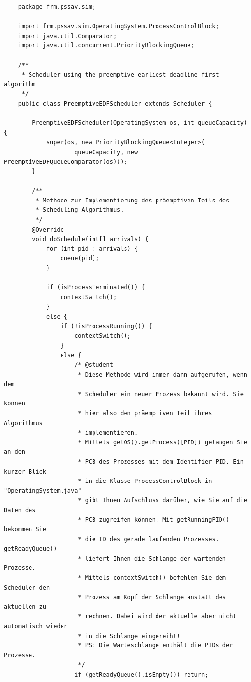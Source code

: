\documentclass[a4paper]{article}
\begin{document}
\begin{lstlisting}
    package frm.pssav.sim;
    
    import frm.pssav.sim.OperatingSystem.ProcessControlBlock;
    import java.util.Comparator;
    import java.util.concurrent.PriorityBlockingQueue;
    
    /**
     * Scheduler using the preemptive earliest deadline first algorithm
     */
    public class PreemptiveEDFScheduler extends Scheduler {
        
        PreemptiveEDFScheduler(OperatingSystem os, int queueCapacity) {
            super(os, new PriorityBlockingQueue<Integer>(
                    queueCapacity, new PreemptiveEDFQueueComparator(os)));
        }
    
        /**
         * Methode zur Implementierung des präemptiven Teils des 
         * Scheduling-Algorithmus.
         */
        @Override
        void doSchedule(int[] arrivals) {
            for (int pid : arrivals) {
                queue(pid);
            }
    
            if (isProcessTerminated()) {
                contextSwitch();
            }
            else {
                if (!isProcessRunning()) {
                    contextSwitch();
                }
                else {
                    /* @student
                     * Diese Methode wird immer dann aufgerufen, wenn dem
                     * Scheduler ein neuer Prozess bekannt wird. Sie können
                     * hier also den präemptiven Teil ihres Algorithmus
                     * implementieren. 
                     * Mittels getOS().getProcess([PID]) gelangen Sie an den
                     * PCB des Prozesses mit dem Identifier PID. Ein kurzer Blick
                     * in die Klasse ProcessControlBlock in "OperatingSystem.java"
                     * gibt Ihnen Aufschluss darüber, wie Sie auf die Daten des 
                     * PCB zugreifen können. Mit getRunningPID() bekommen Sie 
                     * die ID des gerade laufenden Prozesses. getReadyQueue()
                     * liefert Ihnen die Schlange der wartenden Prozesse.
                     * Mittels contextSwitch() befehlen Sie dem Scheduler den
                     * Prozess am Kopf der Schlange anstatt des aktuellen zu
                     * rechnen. Dabei wird der aktuelle aber nicht automatisch wieder
                     * in die Schlange eingereiht!
                     * PS: Die Warteschlange enthält die PIDs der Prozesse.
                     */
                    if (getReadyQueue().isEmpty()) return;
                    

\end{lstlisting}
\end{document}
